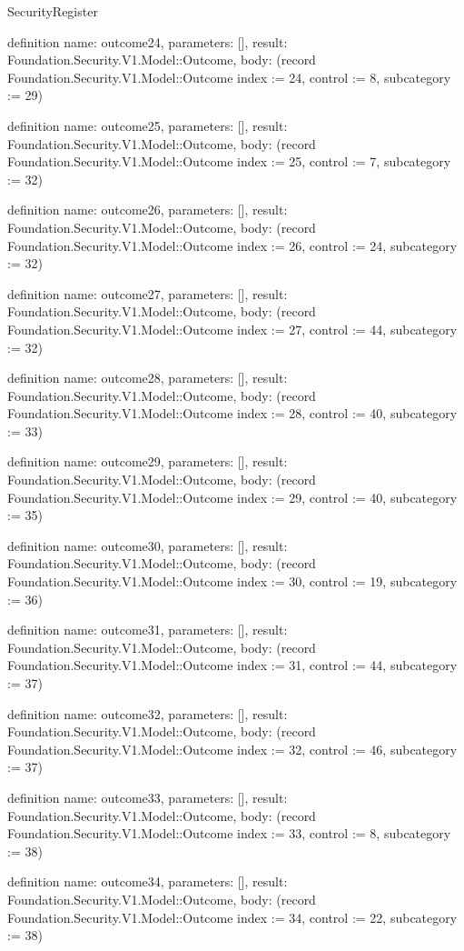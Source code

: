 \begin{lexlean}{SecurityRegister}
\begin{semanticmodule}
definition{
  name: outcome24,
  parameters: [],
  result: Foundation.Security.V1.Model::Outcome,
  body: (record Foundation.Security.V1.Model::Outcome {index := 24, control := 8, subcategory := 29})
}

definition{
  name: outcome25,
  parameters: [],
  result: Foundation.Security.V1.Model::Outcome,
  body: (record Foundation.Security.V1.Model::Outcome {index := 25, control := 7, subcategory := 32})
}

definition{
  name: outcome26,
  parameters: [],
  result: Foundation.Security.V1.Model::Outcome,
  body: (record Foundation.Security.V1.Model::Outcome {index := 26, control := 24, subcategory := 32})
}

definition{
  name: outcome27,
  parameters: [],
  result: Foundation.Security.V1.Model::Outcome,
  body: (record Foundation.Security.V1.Model::Outcome {index := 27, control := 44, subcategory := 32})
}

definition{
  name: outcome28,
  parameters: [],
  result: Foundation.Security.V1.Model::Outcome,
  body: (record Foundation.Security.V1.Model::Outcome {index := 28, control := 40, subcategory := 33})
}

definition{
  name: outcome29,
  parameters: [],
  result: Foundation.Security.V1.Model::Outcome,
  body: (record Foundation.Security.V1.Model::Outcome {index := 29, control := 40, subcategory := 35})
}

definition{
  name: outcome30,
  parameters: [],
  result: Foundation.Security.V1.Model::Outcome,
  body: (record Foundation.Security.V1.Model::Outcome {index := 30, control := 19, subcategory := 36})
}

definition{
  name: outcome31,
  parameters: [],
  result: Foundation.Security.V1.Model::Outcome,
  body: (record Foundation.Security.V1.Model::Outcome {index := 31, control := 44, subcategory := 37})
}

definition{
  name: outcome32,
  parameters: [],
  result: Foundation.Security.V1.Model::Outcome,
  body: (record Foundation.Security.V1.Model::Outcome {index := 32, control := 46, subcategory := 37})
}

definition{
  name: outcome33,
  parameters: [],
  result: Foundation.Security.V1.Model::Outcome,
  body: (record Foundation.Security.V1.Model::Outcome {index := 33, control := 8, subcategory := 38})
}

definition{
  name: outcome34,
  parameters: [],
  result: Foundation.Security.V1.Model::Outcome,
  body: (record Foundation.Security.V1.Model::Outcome {index := 34, control := 22, subcategory := 38})
}


\end{semanticmodule}
\end{lexlean}
